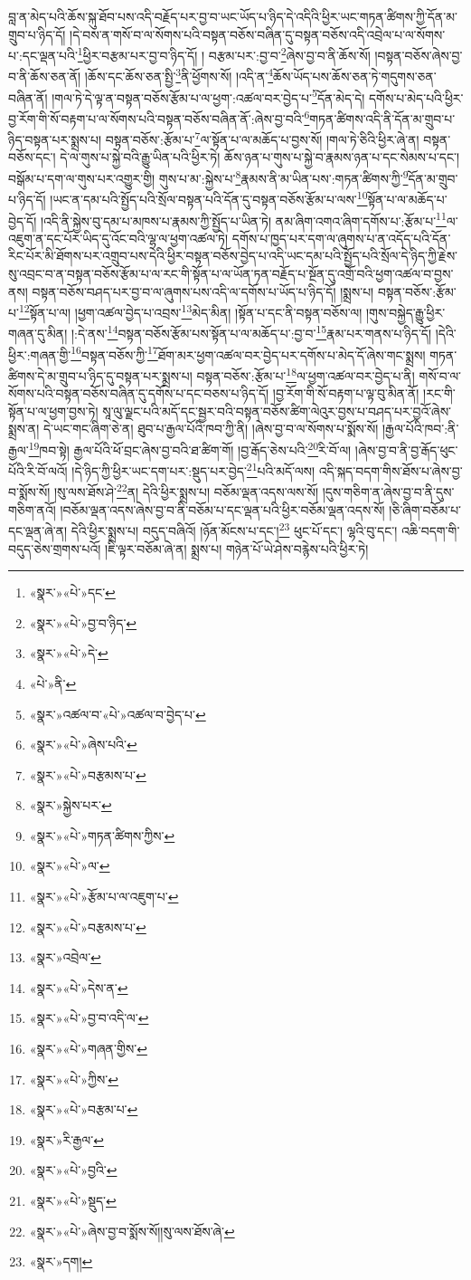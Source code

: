བླ་ན་མེད་པའི་ཆོས་སྐུ་ཐོབ་པས་འདི་བརྗོད་པར་བྱ་བ་ཡང་ཡོད་པ་ཉིད་དེ་འདིའི་ཕྱིར་ཡང་གཏན་ཚིགས་ཀྱི་དོན་མ་གྲུབ་པ་ཉིད་དོ། །དེ་བས་ན་གསོ་བ་ལ་སོགས་པའི་བསྟན་བཅོས་བཞིན་དུ་བསྟན་བཅོས་འདི་འབྲེལ་པ་ལ་སོགས་པ་:དང་ལྡན་པའི་\footnote{«སྣར་»«པེ་»དང་}ཕྱིར་བརྩམ་པར་བྱ་བ་ཉིད་དོ། །
བརྩམ་པར་:བྱ་བ་\footnote{«སྣར་»«པེ་»བྱ་བ་ཉིད་}ཞེས་བྱ་བ་ནི་ཆོས་སོ། །བསྟན་བཅོས་ཞེས་བྱ་བ་ནི་ཆོས་ཅན་ནོ། །ཆོས་དང་ཆོས་ཅན་སྤྱི་\footnote{«སྣར་»«པེ་»དེ་}ནི་ཕྱོགས་སོ། །འདི་ན་\footnote{«པེ་»ནི་}ཆོས་ཡོད་པས་ཆོས་ཅན་ཏེ་གདུགས་ཅན་བཞིན་ནོ། །གལ་ཏེ་དེ་ལྟ་ན་བསྟན་བཅོས་རྩོམ་པ་ལ་ཕྱག་:འཚལ་བར་བྱེད་པ་\footnote{«སྣར་»འཚལ་བ་«པེ་»འཚལ་བ་བྱེད་པ་}དོན་མེད་དེ། དགོས་པ་མེད་པའི་ཕྱིར་བྱ་རོག་གི་སོ་བརྟག་པ་ལ་སོགས་པའི་བསྟན་བཅོས་བཞིན་ནོ་:ཞེས་བྱ་བའི་\footnote{«སྣར་»«པེ་»ཞེས་པའི་}གཏན་ཚིགས་འདི་ནི་དོན་མ་གྲུབ་པ་ཉིད་བསྟན་པར་སྨྲས་པ། བསྟན་བཅོས་:རྩོམ་པ་\footnote{«སྣར་»«པེ་»བརྩམས་པ་}ལ་སྟོན་པ་ལ་མཆོད་པ་བྱས་སོ། །གལ་ཏེ་ཅིའི་ཕྱིར་ཞེ་ན། བསྟན་བཅོས་དང་། དེ་ལ་གུས་པ་སྐྱེ་བའི་རྒྱུ་ཡིན་པའི་ཕྱིར་ཏེ། ཆོས་ཉན་པ་གུས་པ་སྐྱེ་བ་རྣམས་ཉན་པ་དང་སེམས་པ་དང་། བསྒོམ་པ་དག་ལ་གུས་པར་འགྱུར་གྱི། གུས་པ་མ་:སྐྱེས་པ་\footnote{«སྣར་»སྐྱེས་པར་}རྣམས་ནི་མ་ཡིན་པས་:གཏན་ཚིགས་ཀྱི་\footnote{«སྣར་»«པེ་»གཏན་ཚིགས་ཀྱིས་}དོན་མ་གྲུབ་པ་ཉིད་དོ། །ཡང་ན་དམ་པའི་སྤྱོད་པའི་སྲོལ་བསྟན་པའི་དོན་དུ་བསྟན་བཅོས་རྩོམ་པ་ལས་\footnote{«སྣར་»«པེ་»ལ་}སྟོན་པ་ལ་མཆོད་པ་བྱེད་དོ། །འདི་ནི་སྐྱེས་བུ་དམ་པ་མཁས་པ་རྣམས་ཀྱི་སྤྱོད་པ་ཡིན་ཏེ། ནམ་ཞིག་འགའ་ཞིག་དགོས་པ་:རྩོམ་པ་\footnote{«སྣར་»«པེ་»རྩོམ་པ་ལ་འཇུག་པ་}ལ་འཇུག་ན་དང་པོར་ཡིད་དུ་འོང་བའི་ལྷ་ལ་ཕྱག་འཚལ་ཏེ། དགོས་པ་ཁྱད་པར་དག་ལ་ཞུགས་པ་ན་འདོད་པའི་དོན་རིང་པོར་མི་ཐོགས་པར་འགྲུབ་པས་དེའི་ཕྱིར་བསྟན་བཅོས་བྱེད་པ་འདི་ཡང་དམ་པའི་སྤྱོད་པའི་སྲོལ་དེ་ཉིད་ཀྱི་རྗེས་སུ་འབྲང་བ་ན་བསྟན་བཅོས་རྩོམ་པ་ལ་རང་གི་སྟོན་པ་ལ་ཡོན་ཏན་བརྗོད་པ་སྔོན་དུ་འགྲོ་བའི་ཕྱག་འཚལ་བ་བྱས་ནས། བསྟན་བཅོས་བཤད་པར་བྱ་བ་ལ་ཞུགས་པས་འདི་ལ་དགོས་པ་ཡོད་པ་ཉིད་དོ། །སྨྲས་པ། བསྟན་བཅོས་:རྩོམ་པ་\footnote{«སྣར་»«པེ་»བརྩམས་པ་}སྟོན་པ་ལ། །ཕྱག་འཚལ་བྱེད་པ་འབྲས་\footnote{«སྣར་»འབྲེལ་}མེད་མིན། །སྟོན་པ་དང་ནི་བསྟན་བཅོས་ལ། །གུས་བསྐྱེད་རྒྱུ་ཕྱིར་གཞན་དུ་མིན། །:དེ་ནས་\footnote{«སྣར་»«པེ་»དེས་ན་}བསྟན་བཅོས་རྩོམ་པས་སྟོན་པ་ལ་མཆོད་པ་:བྱ་བ་\footnote{«སྣར་»«པེ་»བྱ་བ་འདི་ལ་}རྣམ་པར་གནས་པ་ཉིད་དོ། །དེའི་ཕྱིར་:གཞན་གྱི་\footnote{«སྣར་»«པེ་»གཞན་གྱིས་}བསྟན་བཅོས་ཀྱི་\footnote{«སྣར་»«པེ་»ཀྱིས་}ཐོག་མར་ཕྱག་འཚལ་བར་བྱེད་པར་དགོས་པ་མེད་དོ་ཞེས་གང་སྨྲས། གཏན་ཚིགས་དེ་མ་གྲུབ་པ་ཉིད་དུ་བསྟན་པར་སྨྲས་པ། བསྟན་བཅོས་:རྩོམ་པ་\footnote{«སྣར་»«པེ་»བརྩམ་པ་}ལ་ཕྱག་འཚལ་བར་བྱེད་པ་ནི། གསོ་བ་ལ་སོགས་པའི་བསྟན་བཅོས་བཞིན་དུ་དགོས་པ་དང་བཅས་པ་ཉིད་དོ། །བྱ་རོག་གི་སོ་བརྟག་པ་ལྟ་བུ་མིན་ནོ། །རང་གི་སྟོན་པ་ལ་ཕྱག་བྱས་ཏེ། སཱ་ལུ་ལྗང་པའི་མདོ་དང་སྦྱར་བའི་བསྟན་བཅོས་ཚིག་ལེའུར་བྱས་པ་བཤད་པར་བྱའོ་ཞེས་སྨྲས་ན། དེ་ཡང་གང་ཞིག་ཅེ་ན། ཐུབ་པ་རྒྱལ་པོའི་ཁབ་ཀྱི་ནི། །ཞེས་བྱ་བ་ལ་སོགས་པ་སྨོས་སོ། །རྒྱལ་པོའི་ཁབ་:ནི་རྒྱལ་\footnote{«སྣར་»རི་རྒྱལ་}ཁབ་སྟེ། རྒྱལ་པོའི་ཕོ་བྲང་ཞེས་བྱ་བའི་ཐ་ཚིག་གོ། །བྱ་རྒོད་ཅེས་པའི་\footnote{«སྣར་»«པེ་»བྱའི་}རི་བོ་ལ། །ཞེས་བྱ་བ་ནི་བྱ་རྒོད་ཕུང་པོའི་རི་བོ་ལའོ། །དེ་ཉིད་ཀྱི་ཕྱིར་ཡང་དག་པར་:སྡུད་པར་བྱེད་\footnote{«སྣར་»«པེ་»སྡུད་}པའི་མདོ་ལས། འདི་སྐད་བདག་གིས་ཐོས་པ་ཞེས་བྱ་བ་སྨོས་སོ། །སུ་ལས་ཐོས་ཤེ་\footnote{«སྣར་»«པེ་»ཞེས་བྱ་བ་སྨོས་སོ།།སུ་ལས་ཐོས་ཞེ་}ན། དེའི་ཕྱིར་སྨྲས་པ། བཅོམ་ལྡན་འདས་ལས་སོ། །དུས་གཅིག་ན་ཞེས་བྱ་བ་ནི་དུས་གཅིག་ནའོ། །བཅོམ་ལྡན་འདས་ཞེས་བྱ་བ་ནི་བཅོམ་པ་དང་ལྡན་པའི་ཕྱིར་བཅོམ་ལྡན་འདས་སོ། །ཅི་ཞིག་བཅོམ་པ་དང་ལྡན་ཞེ་ན། དེའི་ཕྱིར་སྨྲས་པ། བདུད་བཞིའོ། །ཉོན་མོངས་པ་དང་།\footnote{«སྣར་»དག།} ཕུང་པོ་དང་། ལྷའི་བུ་དང་། འཆི་བདག་གི་བདུད་ཅེས་གྲགས་པའོ། །ཇི་ལྟར་བཅོམ་ཞེ་ན། སྨྲས་པ། གཉེན་པོ་ཡེ་ཤེས་བརྙེས་པའི་ཕྱིར་ཏེ། 